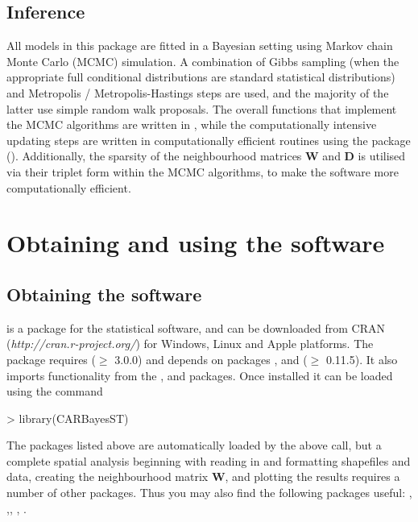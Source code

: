 \documentclass[article,shortnames,nojss]{jss}
\begin{document}
\subsection{Inference}
All models in this package are fitted in a Bayesian setting using Markov chain Monte Carlo (MCMC) simulation. A combination of Gibbs sampling (when the appropriate full conditional distributions are standard statistical distributions) and Metropolis / Metropolis-Hastings steps are used, and the majority of the latter use simple random walk proposals. The overall functions that implement the MCMC algorithms are written in , while the computationally intensive updating steps are written in computationally efficient   routines using the  package  (\citealp{eddelbuettel2011}). Additionally, the sparsity of the neighbourhood matrices $\mathbf{W}$ and $\mathbf{D}$ is utilised via their triplet form within the MCMC algorithms, to make the software more computationally efficient.


\section{Obtaining and using the software}

\subsection{Obtaining the software}
 is a package for the  statistical software, and can be downloaded from CRAN (\emph{http://cran.r-project.org/}) for Windows, Linux and Apple platforms.  The package requires  ($\geq$ 3.0.0) and depends on packages , and  ($\geq$ 0.11.5). It also imports functionality from the ,  and  packages. Once installed it can be loaded using the command

\begin{Schunk}
\begin{Sinput}
> library(CARBayesST)
\end{Sinput}
\end{Schunk}

The packages listed above are automatically loaded by the above call, but a complete spatial analysis beginning with reading in and formatting shapefiles and data, creating the neighbourhood matrix $\mathbf{W}$, and plotting the results requires a number of other packages. Thus you may also find the following packages useful: , ,, , .
\end{document}
